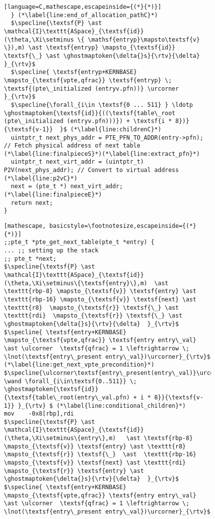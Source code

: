 \begin{figure}
\begin{lstlisting}[language=C,mathescape,escapeinside={(*}{*)}]
  } (*\label{line:end_of_allocation_pathC}*)
  $\specline{\textsf{P} \ast \mathcal{I}\texttt{ASpace}_{\textsf{id}}(\theta,\Xi\setminus \{ \mathsf{entryp}\mapsto\textsf{v} \}),m) \ast \textsf{entryp} \mapsto_{\textsf{id}} \textsf{\_} \ast \ghostmaptoken{\delta{}s}{\rtv}{\delta}  }_{\rtv}$
  $\specline{ \textsf{entryp+KERNBASE} \mapsto_{\textsf{vpte,qfrac}} \textsf{entryp} \; \textsf{(pte\_initialized (entryv.pfn))} \urcorner }_{\rtv}$
  $\specline{\forall_{i\in \textsf{0 ... 511} } \ldotp  \ghostmaptoken{\textsf{id}}{((\textsf{table\_root (pte\_initialized (entryv.pfn)))}) + \textsf{i * 8})}{\textsf{v-1}}  }$ (*\label{line:childrenC}*)
  uintptr_t next_phys_addr = PTE_PFN_TO_ADDR(entry->pfn); // Fetch physical address of next table (*\label{line:finalpieceS}*)(*\label{line:extract_pfn}*)
  uintptr_t next_virt_addr = (uintptr_t) P2V(next_phys_addr); // Convert to virtual address (*\label{line:p2vC}*)
  next = (pte_t *) next_virt_addr;(*\label{line:finalpieceE}*)
  return next;
}
\end{lstlisting}
\else
\begin{lstlisting}[mathescape, basicstyle=\footnotesize,escapeinside={(*}{*)}]
;;pte_t *pte_get_next_table(pte_t *entry) {
... ;; setting up the stack
;; pte_t *next;
$\specline{\textsf{P} \ast \mathcal{I}\texttt{ASpace}_{\textsf{id}}(\theta,\Xi\setminus\{\textsf{entry}\},m)  \ast \texttt{rbp-8} \mapsto_{\textsf{v}} \textsf{entry} \ast  \texttt{rbp-16} \mapsto_{\textsf{v}} \textsf{next} \ast \texttt{r8}  \mapsto_{\textsf{r}} \textsf{\_} \ast \texttt{rdi}  \mapsto_{\textsf{r}} \textsf{\_} \ast \ghostmaptoken{\delta{}s}{\rtv}{\delta}  }_{\rtv}$
$\specline{ \textsf{entry+KERNBASE} \mapsto_{\textsf{vpte,qfrac}} \textsf{entry entry\_val} \ast \ulcorner  \textsf{qfrac} = 1 \leftrightarrow \; \lnot(\textsf{entry\_present entry\_val})\urcorner}_{\rtv}$ (*\label{line:get_next_vpte_precondition}*)
$\specline{\ulcorner\textsf{entry\_present(entry\_val)}\urcorner \wand \forall_{i\in\textsf{0..511}} \; \ghostmaptoken{\textsf{id}}{\textsf{table\_root(entry\_val.pfn) + i * 8}}{\textsf{v-1}} }_{\rtv} $ (*\label{line:conditional_children}*)
mov    -0x8[rbp],rdi
$\specline{\textsf{P} \ast \mathcal{I}\texttt{ASpace}_{\textsf{id}}(\theta,\Xi\setminus\{entry\},m)   \ast \textsf{rbp-8} \mapsto_{\textsf{v}} \textsf{entry} \ast \texttt{r8}  \mapsto_{\textsf{r}} \textsf{\_}  \ast  \texttt{rbp-16} \mapsto_{\textsf{v}} \textsf{next} \ast \texttt{rdi}  \mapsto_{\textsf{r}} \textsf{entry} \ast \ghostmaptoken{\delta{}s}{\rtv}{\delta}  }_{\rtv}$
$\specline{ \textsf{entry+KERNBASE} \mapsto_{\textsf{vpte,qfrac}} \textsf{entry entry\_val} \ast \ulcorner  \textsf{qfrac} = 1 \leftrightarrow \; \lnot(\textsf{entry\_present entry\_val})\urcorner}_{\rtv}$

\end{lstlisting}
\end{figure}
